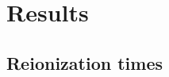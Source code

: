 \documentclass[twocolumn]{aastex61}
\begin{document}
% 
\section{Results}

%
%
%
%



\subsection{Reionization times}
\end{document}
